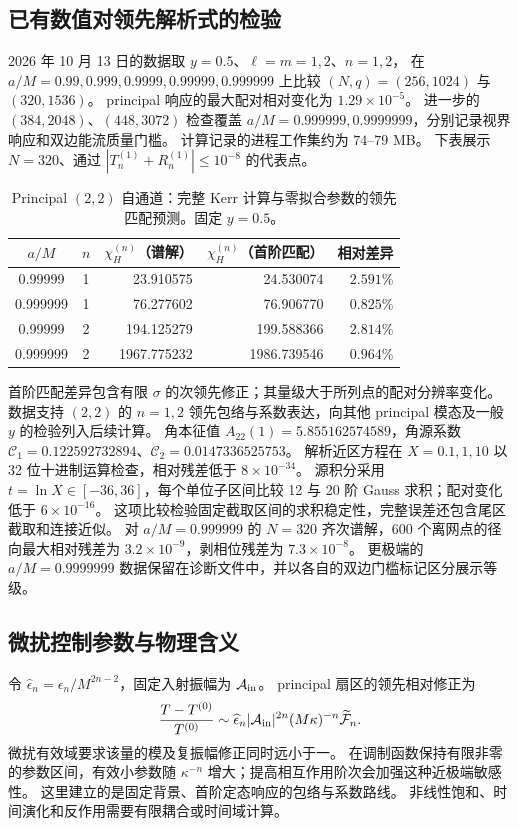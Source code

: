 \documentclass[UTF8,fontset=fandol,11pt,a4paper]{ctexart}
\numberwithin{equation}{section}
\begin{document}
\subsection{已有数值对领先解析式的检验}
2026 年 10 月 13 日的数据取 $y=0.5$、$\ell=m=1,2$、$n=1,2$，
在 $a/M=0.99,0.999,0.9999,0.99999,0.999999$ 上比较 $(N,q)=(256,1024)$ 与 $(320,1536)$。
principal 响应的最大配对相对变化为 $1.29\times10^{-5}$。
进一步的 $(384,2048)$、$(448,3072)$ 检查覆盖 $a/M=0.999999,0.9999999$，分别记录视界响应和双边能流质量门槛。
计算记录的进程工作集约为 $74$--$79$ MB。
下表展示 $N=320$、通过 $|T_n^{(1)}+R_n^{(1)}|\le10^{-8}$ 的代表点。
\begin{table}[htbp]\centering\small
\caption{Principal $(2,2)$ 自通道：完整 Kerr 计算与零拟合参数的领先匹配预测。固定 $y=0.5$。}
\begin{tabular}{ccrrr}\toprule
$a/M$ & $n$ & $\chi_H^{(n)}$（谱解） & $\chi_H^{(n)}$（首阶匹配） & 相对差异\\\midrule
0.99999 & 1 & 23.910575 & 24.530074 & $2.591\%$\\
0.999999 & 1 & 76.277602 & 76.906770 & $0.825\%$\\
0.99999 & 2 & 194.125279 & 199.588366 & $2.814\%$\\
0.999999 & 2 & 1967.775232 & 1986.739546 & $0.964\%$\\\bottomrule
\end{tabular}\end{table}
首阶匹配差异包含有限 $\sigma$ 的次领先修正；其量级大于所列点的配对分辨率变化。
数据支持 $(2,2)$ 的 $n=1,2$ 领先包络与系数表达，向其他 principal 模态及一般 $y$ 的检验列入后续计算。
角本征值 $A_{22}(1)=5.855162574589$，角源系数 $\mathcal C_1=0.122592732894$、$\mathcal C_2=0.0147336525753$。
解析近区方程在 $X=0.1,1,10$ 以 32 位十进制运算检查，相对残差低于 $8\times10^{-34}$。
源积分采用 $t=\ln X\in[-36,36]$，每个单位子区间比较 12 与 20 阶 Gauss 求积；配对变化低于 $6\times10^{-16}$。
这项比较检验固定截取区间的求积稳定性，完整误差还包含尾区截取和连接近似。
对 $a/M=0.999999$ 的 $N=320$ 齐次谱解，600 个离网点的径向最大相对残差为 $3.2\times10^{-9}$，剥相位残差为 $7.3\times10^{-8}$。
更极端的 $a/M=0.9999999$ 数据保留在诊断文件中，并以各自的双边门槛标记区分展示等级。

\subsection{微扰控制参数与物理含义}
令 $\widehat\epsilon_n=\epsilon_n/M^{2n-2}$，固定入射振幅为 $\mathcal A_{\rm in}$。
principal 扇区的领先相对修正为
\begin{equation}
\frac{T-T^{(0)}}{T^{(0)}}
\sim\widehat\epsilon_n|\mathcal A_{\rm in}|^{2n}
(M\kappa)^{-n}\widetilde{\mathcal F}_n.
\end{equation}
微扰有效域要求该量的模及复振幅修正同时远小于一。
在调制函数保持有限非零的参数区间，有效小参数随 $\kappa^{-n}$ 增大；提高相互作用阶次会加强这种近极端敏感性。
这里建立的是固定背景、首阶定态响应的包络与系数路线。
非线性饱和、时间演化和反作用需要有限耦合或时间域计算。
\end{document}
